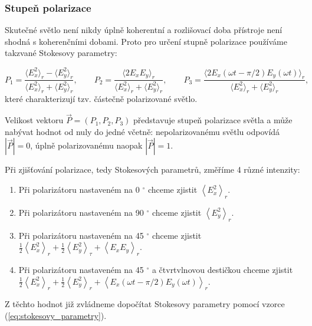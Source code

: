 \documentclass[english]{article}
\begin{document}
		\subsubsection{Stupeň polarizace}
		Skutečné světlo není nikdy úplně koherentní a rozlišovací doba přístroje není shodná s koherenčními dobami. Proto pro určení stupně polarizace používáme takzvané Stokesovy parametry:
		
		\begin{equation} \label{eq:stokesovy_parametry}
		P_1 = \frac{\langle E^2_x \rangle_r - \langle E_y^2 \rangle_r}{\langle E^2_x \rangle_r + \langle E_y^2 \rangle_r}, \qquad P_2 = \frac{\langle 2 E_x E_y \rangle_r}{\langle E^2_x \rangle_r + \langle E_y^2 \rangle_r}, \qquad P_3 = \frac{\langle 2E_x (\omega t - \pi/2) E_y (\omega t) \rangle_r}{\langle E^2_x \rangle_r + \langle E_y^2 \rangle_r},
		\end{equation}
		které charakterizují tzv. částečně polarizované světlo.
		
		Velikost vektoru $\vec{P} = (P_1, P_2, P_3)$ představuje stupeň polarizace světla a může nabývat hodnot od nuly do jedné včetně: nepolarizovanému světlu odpovídá $|\vec{P}| = 0$, úplně polarizovanému naopak $|\vec{P}| = 1$.
		
		Při zjišťování polarizace, tedy Stokesových parametrů, změříme 4 různé intenzity:
		\begin{enumerate}
		 \item Při polarizátoru nastaveném na 0 $^\circ$ chceme zjistit $\left\langle {E_x^2 } \right\rangle _{r}$.
		 \item Při polarizátoru nastaveném na 90 $^\circ$ chceme zjistit $\left\langle {E_y^2 } \right\rangle _{r}$.
		 \item Při polarizátoru nastaveném na 45 $^\circ$ chceme zjistit $\frac{1}{2}\left\langle {E_x^2 } \right\rangle _{r} + \frac{1}{2}\left\langle {E_y^2 } \right\rangle _{\tau} + \left\langle {E_x E_y } \right\rangle _{r}$.
		 \item Při polarizátoru nastaveném na 45 $^\circ$ a čtvrtvlnovou destičkou chceme zjistit \newline $\frac{1}{2}\left\langle {E_x^2 } \right\rangle _{r} + \frac{1}{2}\left\langle {E_y^2 } \right\rangle _{r} + \left\langle {E_{x}(\omega t - \pi/2 ) E_{y}(\omega t)} \right\rangle _{r}$.
		\end{enumerate}
		
		Z těchto hodnot již zvládneme dopočítat Stokesovy parametry pomocí vzorce  (\ref{eq:stokesovy_parametry}).
\end{document}
